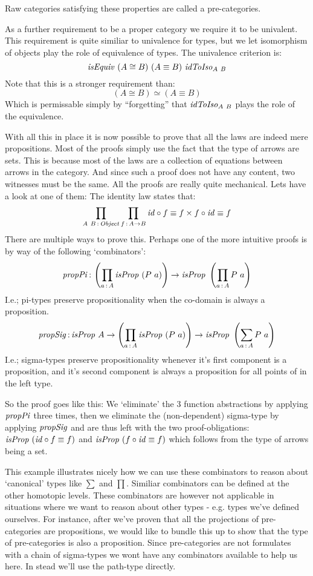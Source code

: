 Raw categories satisfying these properties are called a pre-categories.

As a further requirement to be a proper category we require it to be univalent.
This requirement is quite similiar to univalence for types, but we let
isomorphism of objects play the role of equivalence of types. The univalence
criterion is:
%
$$
\mathit{isEquiv}\ (A \cong B)\ (A \equiv B)\ \mathit{idToIso}_{A\ B}
$$
%
Note that this is a stronger requirement than:
%
$$
(A \cong B) \simeq (A \equiv B)
$$
%
Which is permissable simply by ``forgetting'' that $\mathit{idToIso}_{A\ B}$ plays the
role of the equivalence.

With all this in place it is now possible to prove that all the laws are indeed
mere propositions. Most of the proofs simply use the fact that the type of
arrows are sets. This is because most of the laws are a collection of equations
between arrows in the category. And since such a proof does not have any
content, two witnesses must be the same. All the proofs are really quite
mechanical. Lets have a look at one of them: The identity law states that:
%
$$
\prod_{A\ B \,\mathord{:}\, \mathit{Object}} \prod_{f \,\mathord{:}\, A \to B} \mathit{id} \circ f \equiv f \times f \circ \mathit{id} \equiv f
$$
%
There are multiple ways to prove this. Perhaps one of the more intuitive proofs
is by way of the following `combinators':
%
$$
\mathit{propPi} \tp \left(\prod_{a \tp A} \isProp\ (P\ a)\right) \to \isProp\ \left(\prod_{a \tp A} P\ a\right)
$$
%
I.e.; pi-types preserve propositionality when the co-domain is always a
proposition.
%
$$
\mathit{propSig} \,\mathord{:}\, \mathit{isProp}\ A \to \left(\prod_{a \,\mathord{:}\, A} \mathit{isProp}\ (P\ a)\right) \to \mathit{isProp}\ \left(\sum_{a \,\mathord{:}\, A} P\ a\right)
$$
%
I.e.; sigma-types preserve propositionality whenever it's first component is a
proposition, and it's second component is always a proposition for all points of
in the left type.

So the proof goes like this: We `eliminate' the 3 function abstractions by
applying $\mathit{propPi}$ three times, then we eliminate the (non-dependent) sigma-type
by applying $\mathit{propSig}$ and are thus left with the two proof-obligations:
$\mathit{isProp}\ (\mathit{id} \circ f \equiv f)$ and $\mathit{isProp}\ (f \circ \mathit{id} \equiv f)$ which
follows from the type of arrows being a set.

This example illustrates nicely how we can use these combinators to reason about
`canonical' types like $\sum$ and $\prod$. Similiar combinators can be defined
at the other homotopic levels. These combinators are however not applicable in
situations where we want to reason about other types - e.g. types we've defined
ourselves. For instance, after we've proven that all the projections of
pre-categories are propositions, we would like to bundle this up to show that
the type of pre-categories is also a proposition. Since pre-categories are not
formulates with a chain of sigma-types we wont have any combinators available to
help us here. In stead we'll use the path-type directly.


